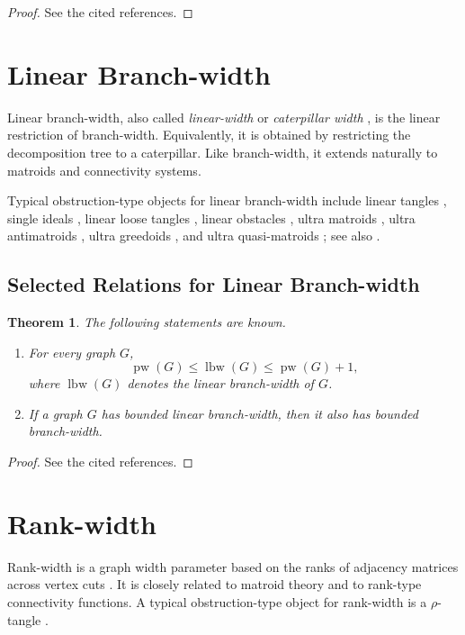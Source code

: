 \documentclass[10pt]{book}
\newtheorem{theorem}{Theorem}[section]
\theoremstyle{definition}
\begin{document}
\begin{proof}
See the cited references.
\end{proof}

\section{Linear Branch-width}

Linear branch-width, also called \emph{linear-width} \cite{fujita2017linear} or \emph{caterpillar width} \cite{Black2013ForbiddenMF}, is the linear restriction of branch-width.  
Equivalently, it is obtained by restricting the decomposition tree to a caterpillar.  
Like branch-width, it extends naturally to matroids and connectivity systems.

Typical obstruction-type objects for linear branch-width include linear tangles \cite{51}, single ideals \cite{52}, linear loose tangles \cite{3}, linear obstacles \cite{50}, ultra matroids \cite{7}, ultra antimatroids \cite{4}, ultra greedoids \cite{4}, and ultra quasi-matroids \cite{375}; see also \cite{423}.

\subsection{Selected Relations for Linear Branch-width}

\begin{theorem}
The following statements are known.
\begin{enumerate}
    \item For every graph \(G\),
    \[
    \operatorname{pw}(G)\leq \operatorname{lbw}(G)\leq \operatorname{pw}(G)+1,
    \]
    where \(\operatorname{lbw}(G)\) denotes the linear branch-width of \(G\). \cite{330}

    \item If a graph \(G\) has bounded linear branch-width, then it also has bounded branch-width.
\end{enumerate}
\end{theorem}

\begin{proof}
See the cited references.
\end{proof}

\section{Rank-width}

Rank-width is a graph width parameter based on the ranks of adjacency matrices across vertex cuts \cite{37}.  
It is closely related to matroid theory \cite{228,229,230} and to rank-type connectivity functions.  
A typical obstruction-type object for rank-width is a \(\rho\)-tangle \cite{53}.
\end{document}
